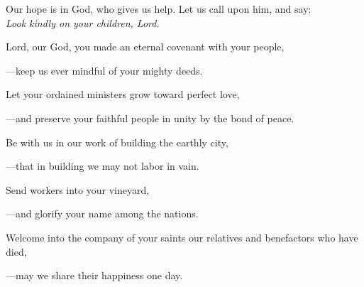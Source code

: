 \intercessions\indent

\begin{hangpar}

Our hope is in God, who gives us help. Let us call upon him, and say:\\
\emph{Look kindly on your children, Lord.}

\medskip Lord, our God, you made an eternal covenant with your people,

{\color{red}---\thinspace}keep us ever mindful of your mighty deeds.

\medskip Let your ordained ministers grow toward perfect love,

{\color{red}---\thinspace}and preserve your faithful people in unity by the bond of peace.

\medskip Be with us in our work of building the earthly city,

{\color{red}---\thinspace}that in building we may not labor in vain.

\medskip Send workers into your vineyard,

{\color{red}---\thinspace}and glorify your name among the nations.

\medskip Welcome into the company of your saints our relatives and benefactors who have died,

{\color{red}---\thinspace}may we share their happiness one day.

\end{hangpar}

